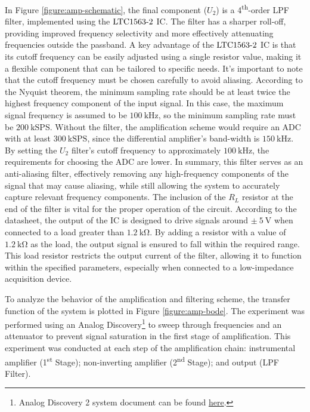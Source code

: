 In Figure \ref{figure:amp-schematic}, the final component ($U_2$) is a 4\textsuperscript{th}-order \ac{LPF} filter, implemented using the $\mathrm{LTC1563\textnormal{-}2}$ \ac{IC}. The filter has a sharper roll-off, providing improved frequency selectivity and more effectively attenuating frequencies outside the passband. A key advantage of the $\mathrm{LTC1563\textnormal{-}2}$ \ac{IC} is that its cutoff frequency can be easily adjusted using a single resistor value, making it a flexible component that can be tailored to specific needs. It's important to note that the cutoff frequency must be chosen carefully to avoid aliasing. According to the Nyquist theorem, the minimum sampling rate should be at least twice the highest frequency component of the input signal. In this case, the maximum signal frequency is assumed to be $\mathrm{100~kHz}$, so the minimum sampling rate must be $\mathrm{200~kSPS}$. Without the filter, the amplification scheme would require an \ac{ADC} with at least $\mathrm{300~kSPS}$, since the differential amplifier's band-width is $\mathrm{150~kHz}$. By setting the $U_2$ filter's cutoff frequency to approximately $\mathrm{100~kHz}$, the requirements for choosing the \ac{ADC} are lower. In summary, this filter serves as an anti-aliasing filter, effectively removing any high-frequency components of the signal that may cause aliasing, while still allowing the system to accurately capture relevant frequency components. The inclusion of the $R_L$ resistor at the end of the filter is vital for the proper operation of the circuit. According to the datasheet, the output of the \ac{IC} is designed to drive signals around $\mathrm{\pm~5~V}$ when connected to a load greater than $\mathrm{1.2~k\Omega}$. By adding a resistor with a value of $\mathrm{1.2~k\Omega}$ as the load, the output signal is ensured to fall within the required range. This load resistor restricts the output current of the filter, allowing it to function within the specified parameters, especially when connected to a low-impedance acquisition device.

To analyze the behavior of the amplification and filtering scheme, the transfer function of the system is plotted in Figure \ref{figure:amp-bode}. The experiment was performed using an Analog Discovery\footnote{Analog Discovery 2 system document can be found \href{https://digilent.com/reference/test-and-measurement/analog-discovery-2/start}{here}.} to sweep through frequencies and an attenuator to prevent signal saturation in the first stage of amplification. This experiment was conducted at each step of the amplification chain: instrumental amplifier (1\textsuperscript{st} Stage); non-inverting amplifier (2\textsuperscript{nd} Stage); and output (\ac{LPF} Filter).

